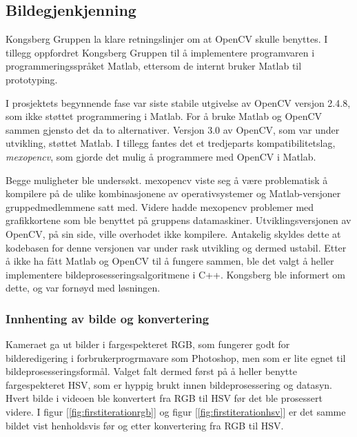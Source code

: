 \subsection{Bildegjenkjenning}

Kongsberg Gruppen la klare retningslinjer om at OpenCV skulle benyttes. I tillegg oppfordret Kongsberg Gruppen til å implementere programvaren i programmeringsspråket Matlab, ettersom de internt bruker Matlab til prototyping.

I prosjektets begynnende fase var siste stabile utgivelse av OpenCV versjon 2.4.8, som ikke støttet programmering i Matlab. For å bruke Matlab og OpenCV sammen gjensto det da to alternativer. Versjon 3.0 av OpenCV, som var under utvikling, støttet Matlab. I tillegg fantes det et tredjeparts kompatibilitetslag, \emph{mexopencv}, som gjorde det mulig å programmere med OpenCV i Matlab.

Begge muligheter ble undersøkt. mexopencv viste seg å være problematisk å kompilere på de ulike kombinasjonene av operativsystemer og Matlab-versjoner gruppedmedlemmene satt med. Videre hadde mexopencv problemer med grafikkortene som ble benyttet på gruppens datamaskiner. Utviklingsversjonen av OpenCV, på sin side, ville overhodet ikke kompilere. Antakelig skyldes dette at kodebasen for denne versjonen var under rask utvikling og dermed ustabil. Etter å ikke ha fått Matlab og OpenCV til å fungere sammen, ble det valgt å heller implementere bildeprosesseringsalgoritmene i C++. Kongsberg ble informert om dette, og var fornøyd med løsningen.

\subsubsection{Innhenting av bilde og konvertering}

Kameraet ga ut bilder i fargespekteret RGB, som fungerer godt for bilderedigering i forbrukerprogrmavare som Photoshop, men som er lite egnet til bildeprosesseringsformål. Valget falt dermed først på å heller benytte fargespekteret HSV, som er hyppig brukt innen bildeprosessering og datasyn. Hvert bilde i videoen ble konvertert fra RGB til HSV før det ble prosessert videre. I figur [\ref{fig:firstiterationrgb}] og figur [\ref{fig:firstiterationhsv}] er det samme bildet vist henholdsvis før og etter konvertering fra RGB til HSV.

